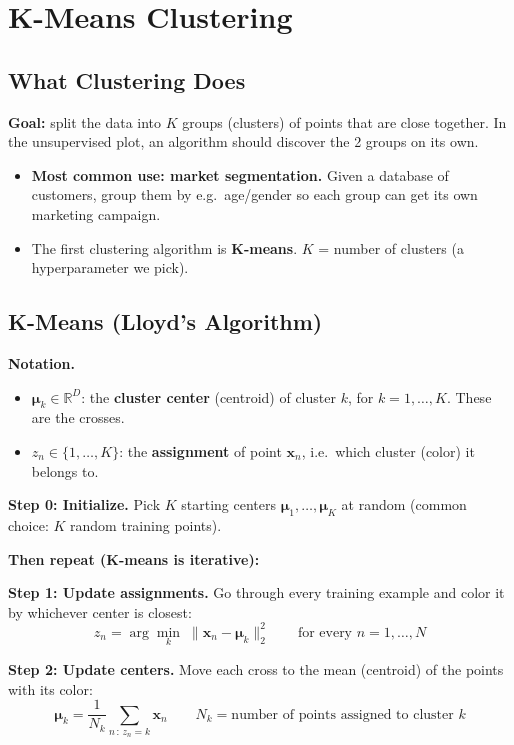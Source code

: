 \section*{K-Means Clustering}

\subsection*{What Clustering Does}
\textbf{Goal:} split the data into $K$ groups (clusters) of points that are close together. In the unsupervised plot, an algorithm should discover the 2 groups on its own.
\begin{itemize}
  \item \textbf{Most common use: market segmentation.} Given a database of customers, group them by e.g.\ age/gender so each group can get its own marketing campaign.
  \item The first clustering algorithm is \textbf{K-means}. $K$ = number of clusters (a hyperparameter we pick).
\end{itemize}

\subsection*{K-Means (Lloyd's Algorithm)}
\textbf{Notation.}
\begin{itemize}
  \item $\boldsymbol{\mu}_k \in \mathbb{R}^D$: the \textbf{cluster center} (centroid) of cluster $k$, for $k = 1, \dots, K$. These are the crosses.
  \item $z_n \in \{1, \dots, K\}$: the \textbf{assignment} of point $\mathbf{x}_n$, i.e.\ which cluster (color) it belongs to.
\end{itemize}

\textbf{Step 0: Initialize.} Pick $K$ starting centers $\boldsymbol{\mu}_1, \dots, \boldsymbol{\mu}_K$ at random (common choice: $K$ random training points).

\textbf{Then repeat (K-means is iterative):}

\textbf{Step 1: Update assignments.} Go through every training example and color it by whichever center is closest:
\[
z_n = \arg\min_{k} \; \|\mathbf{x}_n - \boldsymbol{\mu}_k\|_2^2
\qquad \text{for every } n = 1, \dots, N
\]

\textbf{Step 2: Update centers.} Move each cross to the mean (centroid) of the points with its color:
\[
\boldsymbol{\mu}_k = \frac{1}{N_k} \sum_{n \,:\, z_n = k} \mathbf{x}_n
\qquad N_k = \text{number of points assigned to cluster } k
\]

